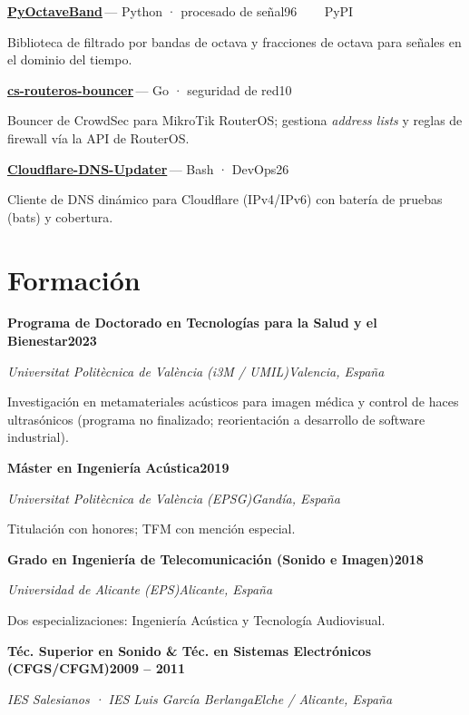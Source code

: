 \documentclass[11pt,a4paper]{article}
\let\jmrpsection\section
\renewcommand{\section}[1]{\needspace{4\baselineskip}\jmrpsection{#1}}
\newcommand{\cventry}[4]{%
  \textbf{#1}\hfill\textbf{#4}\par
  {\color{muted}\textit{#2}\hfill\textit{#3}}\par
  \vspace{2pt}
}
\newcommand{\cvproject}[3]{%
  \textbf{#1}\,\textcolor{muted}{\small— #2}\hfill{\small\textcolor{accent}{#3}}\par
  \vspace{1pt}
}
\newcommand{\divider}{\textcolor{muted}{\ \raisebox{0.4ex}{\scriptsize$\bullet$}\ }}
\begin{document}
\cvproject{\href{https://github.com/jmrplens/PyOctaveBand}{PyOctaveBand}}{Python · procesado de señal}{96\,\faStar \ \divider\ PyPI}
Biblioteca de filtrado por bandas de octava y fracciones de octava para señales en el dominio del tiempo.\par\vspace{4pt}

\cvproject{\href{https://github.com/jmrplens/cs-routeros-bouncer}{cs-routeros-bouncer}}{Go · seguridad de red}{10\,\faStar}
Bouncer de CrowdSec para MikroTik RouterOS; gestiona \textit{address lists} y reglas de firewall vía la API de RouterOS.\par\vspace{4pt}

\cvproject{\href{https://github.com/jmrplens/Cloudflare-DNS-Updater}{Cloudflare-DNS-Updater}}{Bash · DevOps}{26\,\faStar}
Cliente de DNS dinámico para Cloudflare (IPv4/IPv6) con batería de pruebas (bats) y cobertura.

\section{Formación}
\cventry{Programa de Doctorado en Tecnologías para la Salud y el Bienestar}{Universitat Politècnica de València (i3M / UMIL)}{Valencia, España}{2023}
{\color{muted}\small Investigación en metamateriales acústicos para imagen médica y control de haces ultrasónicos (programa no finalizado; reorientación a desarrollo de software industrial).}\par\vspace{4pt}

\cventry{Máster en Ingeniería Acústica}{Universitat Politècnica de València (EPSG)}{Gandía, España}{2019}
{\color{muted}\small Titulación con honores; TFM con mención especial.}\par\vspace{4pt}

\cventry{Grado en Ingeniería de Telecomunicación (Sonido e Imagen)}{Universidad de Alicante (EPS)}{Alicante, España}{2018}
{\color{muted}\small Dos especializaciones: Ingeniería Acústica y Tecnología Audiovisual.}\par\vspace{4pt}

\cventry{Téc. Superior en Sonido \& Téc. en Sistemas Electrónicos (CFGS/CFGM)}{IES Salesianos · IES Luis García Berlanga}{Elche / Alicante, España}{2009 – 2011}
\end{document}

